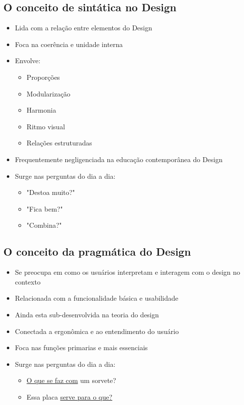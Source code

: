 \documentclass{article}
\begin{document}
\subsection{O conceito de sintática no Design}
\begin{itemize}
    \item Lida com a relação entre elementos do Design
    \item Foca na coerência e unidade interna
    \item Envolve:
    \begin{itemize}
        \item Proporções
        \item Modularização
        \item Harmonia
        \item Ritmo visual
        \item Relações estruturadas
    \end{itemize}
    \item Frequentemente negligenciada na educação contemporânea do Design
    \item Surge nas perguntas do dia a dia: 
    \begin{itemize}
        \item "Destoa muito?"
        \item "Fica bem?"
        \item "Combina?"
    \end{itemize}
\end{itemize}
\subsection{O conceito da pragmática do Design}
\begin{itemize}
    \item Se preocupa em como os usuários interpretam e interagem com o design no contexto
    \item Relacionada com a funcionalidade básica e usabilidade
    \item Ainda esta sub-desenvolvida na teoria do design
    \item Conectada a ergonômica e ao entendimento do usuário
    \item Foca nas funções primarias e mais essenciais
    \item Surge nas perguntas do dia a dia: 
    \begin{itemize}
        \item \underline{O que se faz com} um sorvete?
        \item Essa placa \underline{serve para o que?}
    \end{itemize}
\end{itemize}
\end{document}
